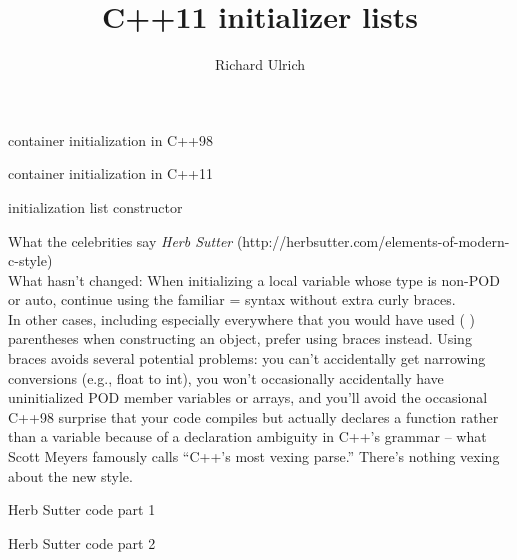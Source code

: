 \documentclass[11pt]{beamer}
\author{Richard Ulrich}
\title{C++11 initializer lists}
\institute{cubx Software AG}
\begin{document}
\begin{frame}
\titlepage
\end{frame}


\begin{frame}{container initialization in C++98}

\end{frame}

\begin{frame}{container initialization in C++11}

\end{frame}

\begin{frame}{initialization list constructor}

\end{frame}

\begin{frame}{What the celebrities say}
\emph{Herb Sutter} (http://herbsutter.com/elements-of-modern-c-style)\\

What hasn’t changed: When initializing a local variable whose type is non-POD or auto, continue using the familiar = syntax without extra curly braces.\\
In other cases, including especially everywhere that you would have used ( ) parentheses when constructing an object, prefer using { } braces instead. Using braces avoids several potential problems: you can’t accidentally get narrowing conversions (e.g., float to int), you won’t occasionally accidentally have uninitialized POD member variables or arrays, and you’ll avoid the occasional C++98 surprise that your code compiles but actually declares a function rather than a variable because of a declaration ambiguity in C++’s grammar – what Scott Meyers famously calls “C++’s most vexing parse.” There’s nothing vexing about the new style.
\end{frame}

\begin{frame}{Herb Sutter code part 1}

\end{frame}

\begin{frame}{Herb Sutter code part 2}

\end{frame}
\end{document}
